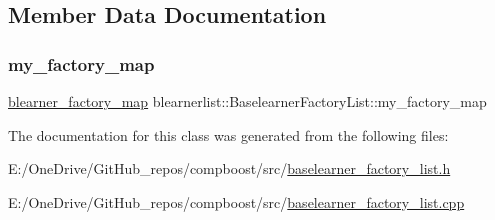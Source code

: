 \subsection{Member Data Documentation}
\mbox{\label{classblearnerlist_1_1_baselearner_factory_list_a839e9b3f1bf73e995c35f7a6d0f64113}} 
\subsubsection{\texorpdfstring{my\+\_\+factory\+\_\+map}{my\_factory\_map}}
{\footnotesize\ttfamily \mbox{\hyperlink{baselearner__factory__list_8h_a058570e00ae11b882cfed36eb40be025}{blearner\+\_\+factory\+\_\+map}} blearnerlist\+::\+Baselearner\+Factory\+List\+::my\+\_\+factory\+\_\+map\hspace{0.3cm}{\ttfamily [private]}}



The documentation for this class was generated from the following files\+:\begin{DoxyCompactItemize}
\item 
E\+:/\+One\+Drive/\+Git\+Hub\+\_\+repos/compboost/src/\mbox{\hyperlink{baselearner__factory__list_8h}{baselearner\+\_\+factory\+\_\+list.\+h}}\item 
E\+:/\+One\+Drive/\+Git\+Hub\+\_\+repos/compboost/src/\mbox{\hyperlink{baselearner__factory__list_8cpp}{baselearner\+\_\+factory\+\_\+list.\+cpp}}\end{DoxyCompactItemize}
